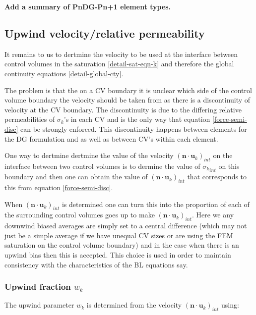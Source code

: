 \documentclass[preprint,authoryear,12pt]{elsarticle}
\begin{document}
{{\bf Add a summary of PnDG-Pn+1 element types.}




				

\subsection{Upwind velocity/relative permeability} 
\label{opt-up} 

It remains to us to dertmine the velocity to be used 
at the interface between control volumes in the 
saturation \ref{detail-sat-eqn-k} and therefore 
the global continuity equations \ref{detail-global-cty}. 

The problem is that the on a CV boundary it is unclear 
which side of the control volume boundary the velocity 
should be taken from as there is a discontinuity 
of velocity at the CV boundary. The discontinuity 
is due to the differing relative permeabilities of 
$\sigma_k$'s in each CV and is the only way that 
equation \ref{force-semi-disc} can be strongly enforced. 
This discontinuity happens between elements for the DG 
formulation and as well as between CV's within each element. 

One way to dertmine dertmine the value of the velocity 
$({{\mathbf n}\cdot{\mathbf u}_k})_{int}$ 
on the interface between two control volumes 
is to dermine the value of ${\sigma_k}_{int}$ on this boundary 
and then one can obtain the value of 
$({{\mathbf n}\cdot{\mathbf u}_k})_{int}$ that 
corresponds to this from equation \ref{force-semi-disc}. 

When $({{\mathbf n}\cdot{\mathbf u}_k})_{int}$ 
is determined one can turn this 
into the proportion of each of the surrounding control 
volumes goes up to make 
$({{\mathbf n}\cdot{\mathbf u}_k})_{int}$. Here we any downwind 
biased averages are simply set to a central difference 
(which may not just be a simple average if we have 
unequal CV sizes or are using the FEM saturation 
on the control volume boundary) and in the case 
when there is an upwind bias then this is accepted. 
This choice is used in order to maintain consistency 
with the characteristics of the BL equations say. 

\subsubsection{Upwind fraction $w_k$} 
The upwind parameter $w_k$ is 
determined from the velocity 
$({{\mathbf n}\cdot{\mathbf u}_k})_{int}$ using:

}
\end{document}
